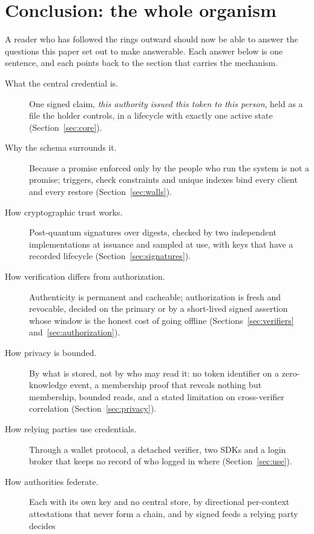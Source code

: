 \section{Conclusion: the whole organism}
\label{sec:conclusion}

A reader who has followed the rings outward should now be able to answer the questions this paper
set out to make answerable. Each answer below is one sentence, and each points back to the section
that carries the mechanism.

\begin{description}
  \item[What the central credential is.] One signed claim, \emph{this authority issued this token to
    this person}, held as a file the holder controls, in a lifecycle with exactly one active state
    (Section~\ref{sec:core}).
  \item[Why the schema surrounds it.] Because a promise enforced only by the people who run the
    system is not a promise; triggers, check constraints and unique indexes bind every client and
    every restore (Section~\ref{sec:walls}).
  \item[How cryptographic trust works.] Post-quantum signatures over digests, checked by two
    independent implementations at issuance and sampled at use, with keys that have a recorded
    lifecycle (Section~\ref{sec:signatures}).
  \item[How verification differs from authorization.] Authenticity is permanent and cacheable;
    authorization is fresh and revocable, decided on the primary or by a short-lived signed assertion
    whose window is the honest cost of going offline (Sections~\ref{sec:verifiers}
    and~\ref{sec:authorization}).
  \item[How privacy is bounded.] By what is stored, not by who may read it: no token identifier on
    a zero-knowledge event, a membership proof that reveals nothing but membership, bounded reads,
    and a stated limitation on cross-verifier correlation (Section~\ref{sec:privacy}).
  \item[How relying parties use credentials.] Through a wallet protocol, a detached verifier, two
    SDKs and a login broker that keeps no record of who logged in where (Section~\ref{sec:use}).
  \item[How authorities federate.] Each with its own key and no central store, by directional
    per-context attestations that never form a chain, and by signed feeds a relying party decides

\end{description}
